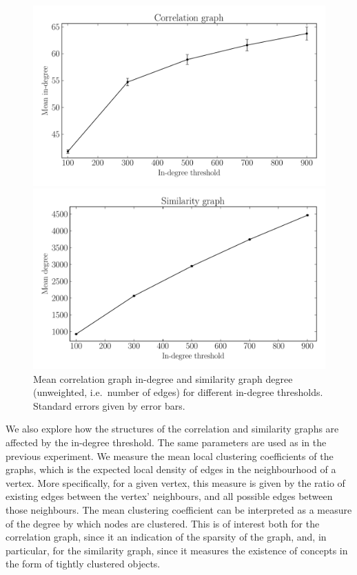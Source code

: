 \documentclass{kais}
\begin{document}
\begin{figure}
\centerline{\includegraphics[width=0.75\columnwidth]{figures/1460368011-c-id.pdf}}
\centerline{\includegraphics[width=0.75\columnwidth]{figures/1460368011-s-d.pdf}}
\caption{Mean correlation graph in-degree and similarity graph degree (unweighted, i.e.\ number of
edges) for different in-degree thresholds. Standard errors given by error bars.}
\label{fig:degrees}
\end{figure}

We also explore how the structures of the correlation and similarity graphs are affected by the in-degree threshold.
The same parameters are used as in the previous experiment. We measure the mean local clustering 
coefficients \cite{Watts1998} of the graphs, which is the expected local density of edges in the neighbourhood of a vertex. 
More specifically, for a given vertex, this measure is given by the ratio of existing edges between the vertex' neighbours, and all 
possible edges between those neighbours. The mean clustering coefficient can be interpreted as a measure of the degree 
by which nodes are clustered. This is of interest both for the correlation graph, since it an indication of the sparsity of 
the graph, and, in particular, for the similarity graph, since it measures the existence of concepts in the form of tightly clustered objects.
\end{document}
